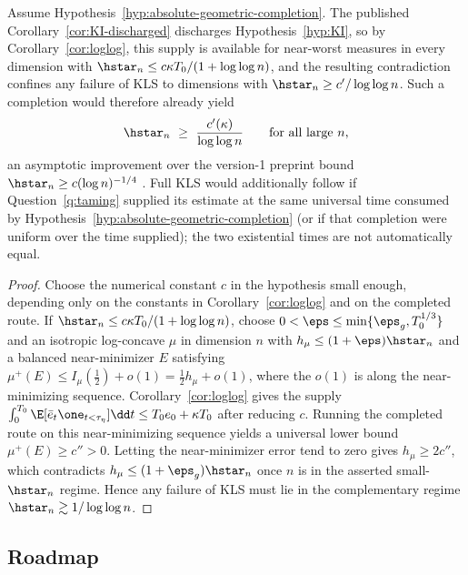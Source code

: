 \documentclass[../../main.tex]{subfiles}
\begin{document}
\begin{corollary}
\label{cor:dichotomy}
Assume Hypothesis~\ref{hyp:absolute-geometric-completion}. The published
Corollary~\ref{cor:KI-discharged} discharges Hypothesis~\ref{hyp:KI}, so by
Corollary~\textup{\ref{cor:loglog}}, this supply is available for near-worst measures in every
dimension with $\hstar_n\le c\kappa T_0/(1+\log\log n)$, and the resulting contradiction
confines any failure of KLS to dimensions with $\hstar_n\ge c'/\log\log n$. Such a completion
would therefore already yield
\[
  \hstar_n\ \ge\ \frac{c'(\kappa)}{\log\log n}
  \qquad\text{for all large }n,
\]
an asymptotic improvement over the version-1 preprint bound
$\hstar_n\ge c(\log n)^{-1/4}$ \cite{Letwin2026QuadraticKLS}. Full KLS would additionally
follow if Question~\textup{\ref{q:taming}} supplied its estimate at the same universal time
consumed by Hypothesis~\textup{\ref{hyp:absolute-geometric-completion}} (or if that completion
were uniform over the time supplied); the two existential times are not automatically equal.
\end{corollary}

\begin{proof}
Choose the numerical constant $c$ in the hypothesis small enough, depending only on the constants
in Corollary~\ref{cor:loglog} and on the completed route. If
$\hstar_n\le c\kappa T_0/(1+\log\log n)$, choose
$0<\eps\le\min\{\eps_g,T_0^{1/3}\}$ and an isotropic log-concave $\mu$ in dimension $n$ with
$h_\mu\le(1+\eps)\hstar_n$ and a balanced near-minimizer $E$ satisfying
$\mu^+(E)\le I_\mu(\tfrac12)+o(1)=\tfrac12h_\mu+o(1)$, where the $o(1)$ is along the
near-minimizing sequence. Corollary~\ref{cor:loglog} gives the supply
$\int_0^{T_0}\E[\bar e_t\one_{t<\tau_\eta}]\dd t\le T_0e_0+\kappa T_0$ after reducing $c$.
Running the completed route on this near-minimizing sequence yields a universal lower bound
$\mu^+(E)\ge c''>0$. Letting the near-minimizer error tend to zero gives $h_\mu\ge2c''$, which
contradicts $h_\mu\le(1+\eps_g)\hstar_n$ once $n$ is in the asserted small-$\hstar_n$ regime. Hence any
failure of KLS must lie in the complementary regime $\hstar_n\gtrsim1/\log\log n$.
\end{proof}

\subsection{Roadmap}
\end{document}

